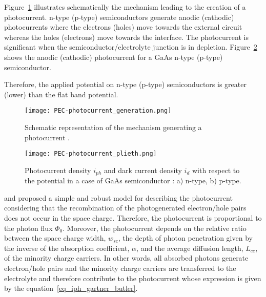     Figure~\ref{fig_photocurrent_generation} illustrates schematically the 
    mechanism leading to the creation of a photocurrent. n-type (p-type) 
    semiconductors generate anodic (cathodic) photocurrents where the 
    electrons (holes) move towards the external circuit whereas the holes (electrons) 
    move towards the interface. 
    The photocurrent is significant when the semiconductor/electrolyte junction 
    is in depletion. 
    Figure~\ref{fig_photocurrent_plieth} shows the anodic (cathodic) photocurrent 
    for a GaAs n-type (p-type) semiconductor.

    Therefore, the applied potential on n-type (p-type) semiconductors is 
    greater (lower) than the flat band potential. 

    \begin{figure}[h]
        \centering
        \texttt{[image: PEC-photocurrent\_generation.png]}
        \caption{Schematic representation of the mechanism generating 
        a photocurrent \citep{memming2008,bard2002}.}
        \label{fig_photocurrent_generation}
    \end{figure}

    \begin{figure}[h]
        \centering
        \texttt{[image: PEC-photocurrent\_plieth.png]}
        \caption{Photocurrent density $i_{ph}$ and dark current density 
        $i_d$ with respect to the potential in a case of GaAs semiconductor 
        \citep{plieth2008}: a) n-type, b) p-type.}
        \label{fig_photocurrent_plieth}
    \end{figure}

    \citet{gartner1959} and \citet{butler1977}  
    proposed a simple and robust model for 
    describing the photocurrent considering that the recombination of the 
    photogenerated electron/hole pairs does not occur in the space charge. 
    Therefore, the photocurrent is proportional to the photon flux $\Phi _0$. 
    Moreover, the photocurrent depends on the relative ratio between the space 
    charge width, $w_{sc}$, the depth of photon penetration given by the inverse 
    of the absorption coefficient, $ \alpha $, and the average diffusion length, 
    $L_{cc}$, of the minority charge carriers. 
    In other words, all absorbed photons generate electron/hole pairs and 
    the minority charge carriers are transferred to the electrolyte and 
    therefore contribute to the photocurrent whose expression is given 
    by the equation~\ref{eq_iph_gartner_butler}.

